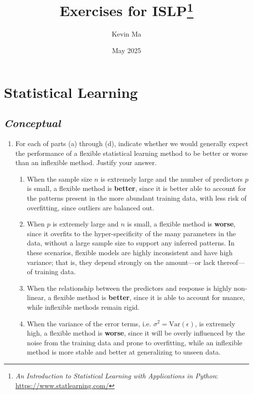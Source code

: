 \documentclass[11pt]{article}
\title{Exercises for ISLP\footnote{\textit{An Introduction to
    Statistical Learning with Applications in Python}:
\url{https://www.statlearning.com/}}}
\author{Kevin Ma}
\date{May 2025}
\begin{document}
\maketitle

\setcounter{section}{1}

\section{Statistical Learning}

\subsection*{\textit{Conceptual}}

\begin{enumerate}
  \item For each of parts (a) through (d), indicate whether we would generally
    expect the performance of a flexible statistical learning method to be
    better or worse than an inflexible method. Justify your answer.
    \begin{enumerate}
      \item When the sample size $n$ is extremely large and the
        number of predictors $p$ is small, a flexible method is
        \textbf{better}, since it is better able to account for the
        patterns present in the more abundant training data, with
        less risk of overfitting, since outliers are balanced out.
      \item When $p$ is extremely large and $n$ is small, a flexible
        method is \textbf{worse}, since it overfits to the
        hyper-specificity of the many parameters in the data, without
        a large sample size to support any inferred patterns. In
        these scenarios, flexible models are highly inconsistent and
        have high variance; that is, they depend strongly on the
        amount---or lack thereof---of training data.
      \item When the relationship between the predictors and response
        is highly non-linear, a flexible method is \textbf{better},
        since it is able to account for nuance, while inflexible
        methods remain rigid.
      \item When the variance of the error terms, i.e. $\sigma^2 =
        \text{Var}(\epsilon)$, is extremely high, a flexible method
        is \textbf{worse}, since it will be overly influenced by the
        noise from the training data and prone to overfitting, while
        an inflexible method is more stable and better at
        generalizing to unseen data.
    \end{enumerate}


\end{enumerate}
\end{document}
